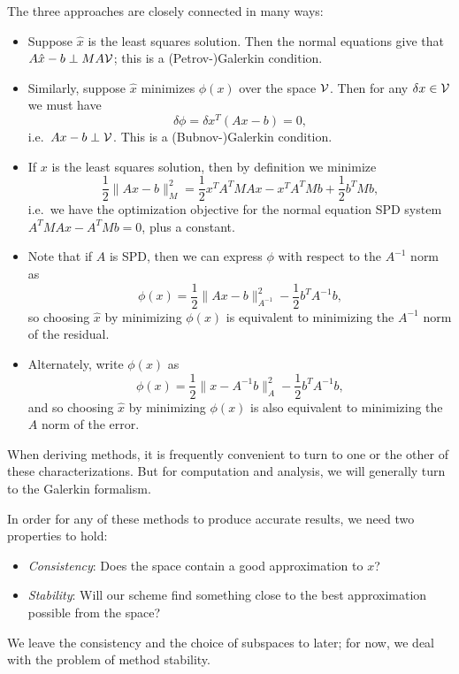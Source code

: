 \documentclass[12pt, leqno]{article} %
\begin{document}
The three approaches are closely connected in many ways:
\begin{itemize}
\item
  Suppose $\hat{x}$ is the least squares solution.  Then the normal
  equations give that $A\hat{x}-b \perp M A\mathcal{V}$; this is a
  (Petrov-)Galerkin condition.
\item
  Similarly, suppose $\hat{x}$ minimizes $\phi(x)$ over the space
  $\mathcal{V}$.  Then for any $\delta x \in \mathcal{V}$ we must have
  \[
    \delta \phi = \delta x^T (Ax-b) = 0,
  \]
  i.e.~$Ax-b \perp \mathcal{V}$.  This is a (Bubnov-)Galerkin condition.
\item
  If $x$ is the least squares solution, then by definition
  we minimize
  \[
    \frac{1}{2} \|Ax-b\|_M^2 = \frac{1}{2} x^T A^T M A x - x^T A^T M b + \frac{1}{2} b^T M b,
  \]
  i.e.~we have the optimization objective for the normal equation
  SPD system $A^T M A x - A^T M b = 0$, plus a constant.
\item
  Note that if $A$ is SPD, then we can express $\phi$ with respect to
  the $A^{-1}$ norm as
  \[
    \phi(x) = \frac{1}{2} \|Ax-b\|_{A^{-1}}^2 - \frac{1}{2} b^T A^{-1} b,
  \]
  so choosing $\hat{x}$ by minimizing $\phi(x)$ is equivalent to
  minimizing the $A^{-1}$ norm of the residual.
\item
  Alternately, write $\phi(x)$ as
  \[
    \phi(x) = \frac{1}{2} \|x-A^{-1} b\|_A^2 - \frac{1}{2} b^T A^{-1} b,
  \]
  and so choosing $\hat{x}$ by minimizing $\phi(x)$ is also
  equivalent to minimizing the $A$ norm of the error.
\end{itemize}
When deriving methods, it is frequently convenient to turn to one or
the other of these characterizations.  But for computation and analysis,
we will generally turn to the Galerkin formalism.

In order for any of these methods to produce accurate results, we need
two properties to hold:
\begin{itemize}
\item {\em Consistency}: Does the space contain a good approximation to $x$?
\item {\em Stability}: Will our scheme find something close to the best
  approximation possible from the space?
\end{itemize}
We leave the consistency and the choice of subspaces to later; for now,
we deal with the problem of method stability.
\end{document}
